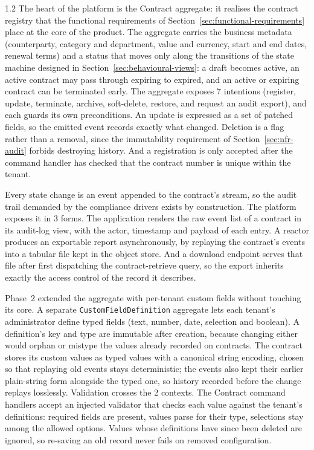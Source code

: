 \begin{spacing}{1.2}
The heart of the platform is the Contract aggregate: it realises the
contract registry that the functional requirements of
Section~\ref{sec:functional-requirements} place at the core of the
product. The aggregate carries the business metadata (counterparty, category and department,
value and currency, start and end dates, renewal terms) and a status
that moves only along the transitions of the state machine designed in
Section~\ref{sec:behavioural-views}: a draft becomes active, an active
contract may pass through expiring to expired, and an active or expiring
contract can be terminated early. The aggregate exposes 7 intentions
(register, update, terminate, archive, soft-delete, restore, and request
an audit export), and each guards its own preconditions. An update is
expressed as a set of patched fields, so the emitted event records
exactly what changed. Deletion is a flag rather than a removal, since
the immutability requirement of Section~\ref{sec:nfr-audit} forbids
destroying history. And a registration is only accepted after the
command handler has checked that the contract number is unique within
the tenant.

Every state change is an event appended to the contract's stream, so the
audit trail demanded by the compliance drivers exists by construction.
The platform exposes it in 3 forms. The application renders the raw
event list of a contract in its audit-log view, with the actor,
timestamp and payload of each entry. A reactor produces an exportable
report asynchronously, by replaying the contract's events into a tabular
file kept in the object store. And a download endpoint serves that file
after first dispatching the contract-retrieve query, so the export
inherits exactly the access control of the record it describes.

Phase~2 extended the aggregate with per-tenant custom fields without
touching its core. A separate \texttt{CustomFieldDefinition} aggregate
lets each tenant's administrator define typed fields (text, number,
date, selection and boolean). A definition's key and type are immutable
after creation, because changing either would orphan or mistype the
values already recorded on contracts. The contract stores its custom
values as typed values with a canonical string encoding, chosen so that
replaying old events stays deterministic; the events also kept their
earlier plain-string form alongside the typed one, so history recorded
before the change replays losslessly. Validation crosses the 2 contexts.
The Contract command handlers accept an injected validator that checks
each value against the tenant's definitions: required fields are
present, values parse for their type, selections stay among the allowed
options. Values whose definitions have since been deleted are ignored,
so re-saving an old record never fails on removed configuration.


\end{spacing}
